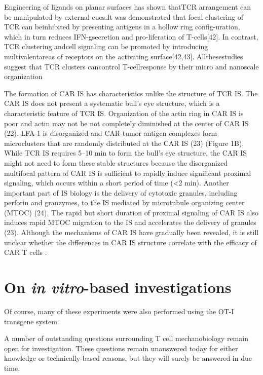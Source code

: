 Engineering of ligands on planar surfaces has shown thatTCR arrangement can be manipulated by external cues.It was demonstrated that focal clustering of TCR can beinhibited by presenting antigens in a hollow ring config-uration, which in turn reduces IFN-gsecretion and pro-liferation of T-cells[42]. In contrast, TCR clustering andcell signaling can be promoted by introducing multivalentareas of receptors on the activating surface[42,43]. Allthesestudies suggest that TCR clusters cancontrol T-cellresponse by their micro and nanoscale organization \cite{Aramesh2019}

The formation of CAR IS has characteristics unlike the structure of TCR IS. The CAR IS does not present a systematic bull's eye structure, which is a characteristic feature of TCR IS. Organization of the actin ring in CAR IS is poor and actin may not be not completely diminished at the center of CAR IS (22). LFA-1 is disorganized and CAR-tumor antigen complexes form microclusters that are randomly distributed at the CAR IS (23) (Figure 1B). While TCR IS requires 5–10 min to form the bull's eye structure, the CAR IS might not need to form these stable structures because the disorganized multifocal pattern of CAR IS is sufficient to rapidly induce significant proximal signaling, which occurs within a short period of time (<2 min). Another important part of IS biology is the delivery of cytotoxic granules, including perforin and granzymes, to the IS mediated by microtubule organizing center (MTOC) (24). The rapid but short duration of proximal signaling of CAR IS also induces rapid MTOC migration to the IS and accelerates the delivery of granules (23). Although the mechanisms of CAR IS have gradually been revealed, it is still unclear whether the differences in CAR IS structure correlate with the efficacy of CAR T cells \cite{Li2020, Watanabe2018}.

\section{On \textit{in vitro}-based investigations}

Of course, many of these experiments were also performed using the OT-I transgene system. 


A number of outstanding questions surrounding T cell mechanobiology remain open for investigation. These questions remain unanswered today for either knowledge or technically-based reasons, but they will surely be answered in due time.
